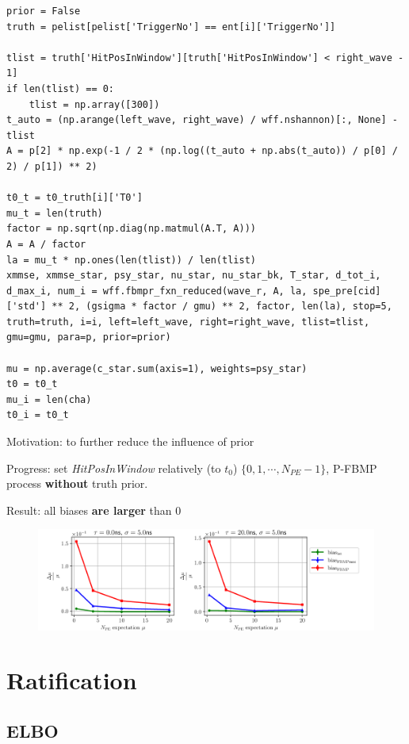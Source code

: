 \documentclass[notitlepage]{article}
\begin{document}
\begin{lstlisting}
prior = False
truth = pelist[pelist['TriggerNo'] == ent[i]['TriggerNo']]

tlist = truth['HitPosInWindow'][truth['HitPosInWindow'] < right_wave - 1]
if len(tlist) == 0:
    tlist = np.array([300])
t_auto = (np.arange(left_wave, right_wave) / wff.nshannon)[:, None] - tlist
A = p[2] * np.exp(-1 / 2 * (np.log((t_auto + np.abs(t_auto)) / p[0] / 2) / p[1]) ** 2)

t0_t = t0_truth[i]['T0']
mu_t = len(truth)
factor = np.sqrt(np.diag(np.matmul(A.T, A)))
A = A / factor
la = mu_t * np.ones(len(tlist)) / len(tlist)
xmmse, xmmse_star, psy_star, nu_star, nu_star_bk, T_star, d_tot_i, d_max_i, num_i = wff.fbmpr_fxn_reduced(wave_r, A, la, spe_pre[cid]['std'] ** 2, (gsigma * factor / gmu) ** 2, factor, len(la), stop=5, truth=truth, i=i, left=left_wave, right=right_wave, tlist=tlist, gmu=gmu, para=p, prior=prior)

mu = np.average(c_star.sum(axis=1), weights=psy_star)
t0 = t0_t
mu_i = len(cha)
t0_i = t0_t
\end{lstlisting}

Motivation: to further reduce the influence of prior

Progress: set \textit{HitPosInWindow} relatively (to $t_0$) $\{0,1,\cdots,N_{PE}-1\}$, P-FBMP process \textbf{without} truth prior. 

Result: all biases \textbf{are larger} than 0

\begin{figure}[H]
    \centering
    \includegraphics[width=\textwidth]{vs-biasmu-fixtlistnoprior.png}
\end{figure}

\section{Ratification}

\subsection{ELBO}
\end{document}
